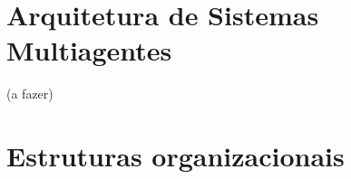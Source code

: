 \section{Arquitetura de Sistemas Multiagentes}


(a fazer)

\section{Estruturas organizacionais}

\cite{kolp2006}

